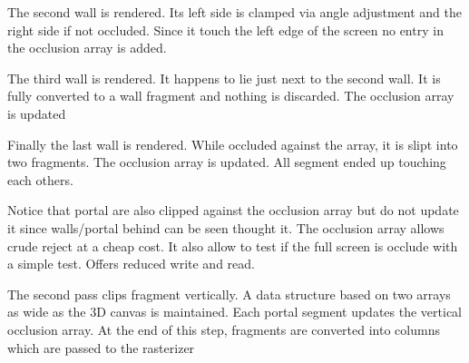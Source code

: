 The second wall is rendered. Its left side is clamped via angle adjustment and the right side if not occluded. Since it touch the left edge of the screen no entry in the occlusion array is added.
\par
\begin{minipage}{0.54\textwidth}
\centering
{}
\end{minipage}
\begin{minipage}{0.45\textwidth}
\centering
{}
\end{minipage}
\par





The third wall is rendered. It happens to lie just next to the second wall. It is fully converted to a wall fragment and nothing is discarded. The occlusion array is updated
\begin{minipage}{0.54\textwidth}
\centering
{}
\end{minipage}
\begin{minipage}{0.46\textwidth}
\centering
{}
\end{minipage}
\par


Finally the last wall is rendered. While occluded against the array, it is slipt into two fragments. The occlusion array is updated. All segment ended up touching each others. 
\begin{minipage}{0.54\textwidth}
\centering
{}
\end{minipage}
\begin{minipage}{0.46\textwidth}
\centering
{}
\end{minipage}
\par
Notice that portal are also clipped against the occlusion array but do not update it since walls/portal behind can be seen thought it. The occlusion array allows crude reject at a cheap cost. It also allow to test if the full screen is occlude with a simple test. Offers reduced write and read.\\
\par
The second pass clips fragment vertically. A data structure based on two arrays as wide as the 3D canvas is maintained. Each portal segment updates the vertical occlusion array. At the end of this step, fragments are converted into columns which are passed to the rasterizer \\
\par
{}
\par



